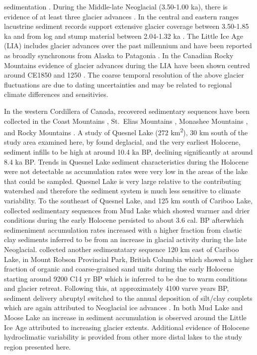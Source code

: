 \documentclass[Royal,times,doublespace,sageh]{sagej}
\begin{document}
sedimentation
\citep{Koch2007a, Osborn2007, Menounos2008c, Gardner1985, Wood2004, Hodder2006b, Desloges1999, Leonard1999}.
During the Middle-late Neoglacial (3.50-1.00 ka), there is evidence of
at least three glacier advances \citep{Menounos2009b}. In the central
and eastern ranges lacustrine sediment records support extensive glacier
coverage between 3.50-1.85 ka
\citep{Leonard1999, Leonard1997, Dirszowsky1997a, Desloges1999} and from
log and stump material between 2.04-1.32 ka
\citep{Luckman1995, Luckman1999}. The Little Ice Age (LIA) includes
glacier advances over the past millennium and have been reported as
broadly synchronous from Alaska to Patagonia \citep{Luckman2000e}. In
the Canadian Rocky Mountains evidence of glacier advances during the LIA
have been shown centred around CE1850 \citep{Luckman2000e, Leonard1997}
and 1250 \citep{Luckman1995, Osborn2001, Leonard1997}. The coarse
temporal resolution of the above glacier fluctuations are due to dating
uncertainties and may be related to regional climate differences and
sensitivies.

In the western Cordillera of Canada, recovered sedimentary sequences
have been collected in the Coast Mountains \citep{Menounos2008c},
St.~Elias Mountains \citep{Crookshanks2008}, Monashee Mountains
\citep{Hodder2006b}, and Rocky Mountains
\citep{Leonard1986, Dirszowsky1997a, Desloges1999}. A study of Quesnel
Lake (272 km\textsuperscript{2}), 30 km south of the study area examined
here, by \citet{Gilbert2012} found deglacial, and the very earliest
Holocene, sediment infills to be high at around 10.4 ka BP, declining
significantly at around 8.4 ka BP. Trends in Quesnel Lake sediment
characteristics during the Holocene were not detectable as accumulation
rates were very low in the areas of the lake that could be sampled.
Quesnel Lake is very large relative to the contributing watershed and
therefore the sediment system is much less sensitive to climate
variability. To the southeast of Quesnel Lake, and 125 km south of
Cariboo Lake, \citet{Hodder2006b} collected sedimentary sequences from
Mud Lake which showed warmer and drier conditions during the early
Holocene persisted to about 3.6 cal. BP afterwhich sedimeniment
accumulation rates increased with a higher fraction from clastic clay
sediments inferred to be from an increase in glacial activity during the
late Neoglacial. \citet{Desloges1999} collected another sedimentatary
sequence 120 km east of Cariboo Lake, in Mount Robson Provincial Park,
British Columbia which showed a higher fraction of organic and
coarse-grained sand units during the early Holocene starting around 9200
C14 yr BP which is inferred to be due to warm conditions and glacier
retreat. Following this, at approximately 4100 varve years BP, sediment
delivery abruptyl switched to the annual deposition of silt/clay
couplets which are again attributed to Neoglacial ice advances
\citep[e.g.~Peyto Advance,][]{Luckman1995}. In both Mud Lake and Moose
Lake an increase in sediment accumulation is observed around the Little
Ice Age attributed to increasing glacier extents. Additional evidence of
Holocene hydroclimatic variability is provided from other more distal
lakes to the study region presented here.
\end{document}
